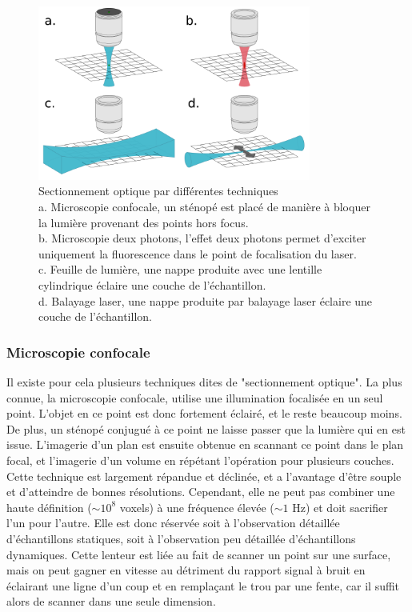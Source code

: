 \begin{figure}
  \centering
  \includegraphics[width=0.8\textwidth]{./files/optical_sectionning.svg.png}
  \caption{Sectionnement optique par différentes techniques \\
  a. Microscopie confocale, un sténopé est placé de manière à bloquer la lumière provenant des points hors focus. \\
  b. Microscopie deux photons, l'effet deux photons permet d'exciter uniquement la fluorescence dans le point de focalisation du laser. \\
  c. Feuille de lumière, une nappe produite avec une lentille cylindrique éclaire une couche de l'échantillon. \\
  d. Balayage laser, une nappe produite par balayage laser éclaire une couche de l'échantillon. \\
  }
  \end{figure}

\subsubsection{Microscopie confocale}

Il existe pour cela plusieurs techniques dites de "sectionnement optique". La plus connue, la microscopie confocale, utilise une illumination focalisée en un seul point. L'objet en ce point est donc fortement éclairé, et le reste beaucoup moins. De plus, un sténopé conjugué à ce point ne laisse passer que la lumière qui en est issue. L'imagerie d'un plan est ensuite obtenue en scannant ce point dans le plan focal, et l'imagerie d'un volume en répétant l'opération pour plusieurs couches. Cette technique est largement répandue et déclinée, et a l'avantage d'être souple et d'atteindre de bonnes résolutions. Cependant, elle ne peut pas combiner une haute définition ($\sim 10^8$ voxels) à une fréquence élevée ($\sim 1$ Hz) et doit sacrifier l'un pour l'autre. Elle est donc réservée soit à l'observation détaillée d'échantillons statiques, soit à l'observation peu détaillée d'échantillons dynamiques. Cette lenteur est liée au fait de scanner un point sur une surface, mais on peut gagner en vitesse au détriment du rapport signal à bruit en éclairant une ligne d'un coup et en remplaçant le trou par une fente, car il suffit alors de scanner dans une seule dimension.

